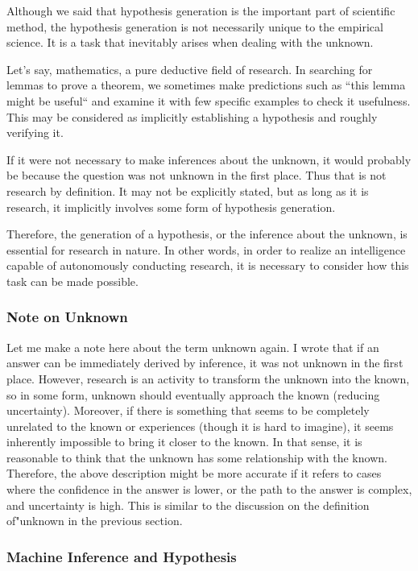 \documentclass{book}
\begin{document}
Although we said that hypothesis generation is the important part of scientific method, the hypothesis generation is not necessarily unique to the empirical science. It is a task that inevitably arises when dealing with the unknown. 

Let's say, mathematics, a pure deductive field of research. In searching for lemmas to prove a theorem, we sometimes make predictions such as ``this lemma might be useful`` and examine it with few specific examples to check it usefulness. This may be considered as implicitly establishing a hypothesis and roughly verifying it. 

If it were not necessary to make inferences about the unknown, it would probably be because the question was not unknown in the first place. Thus that is not research by definition. It may not be explicitly stated, but as long as it is research, it implicitly involves some form of hypothesis generation. 

Therefore, the generation of a hypothesis, or the inference about the unknown, is essential for research in nature. In other words, in order to realize an intelligence capable of autonomously conducting research, it is necessary to consider how this task can be made possible.

\subsubsection{Note on Unknown}
Let me make a note here about the term unknown again. I wrote that if an answer can be immediately derived by inference, it was not unknown in the first place. However, research is an activity to transform the unknown into the known, so in some form, unknown should eventually approach the known (reducing uncertainty). Moreover, if there is something that seems to be completely unrelated to the known or experiences (though it is hard to imagine), it seems inherently impossible to bring it closer to the known. In that sense, it is reasonable to think that the unknown has some relationship with the known. Therefore, the above description might be more accurate if it refers to cases where the confidence in the answer is lower, or the path to the answer is complex, and uncertainty is high. This is similar to the discussion on the definition of"unknown in the previous section.

\subsubsection{Machine Inference and Hypothesis}
\end{document}
